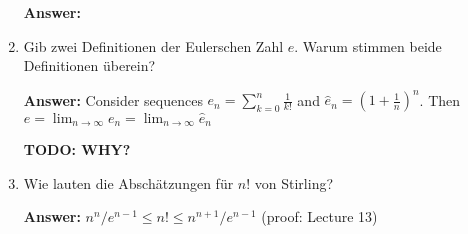 \documentclass[11pt]{article}
\newcommand{\sumn}[4]{\sum_{#1=#2}^{#3}{#4}}
\newcommand{\slim}[2]{\lim_{#1\to\infty}{#2}}
\begin{document}
\begin{enumerate}
    \textbf{Answer:}
    \item Gib zwei Definitionen der Eulerschen Zahl $e$. Warum stimmen beide Definitionen überein?
    
    \textbf{Answer:} Consider sequences $e_n = \sumn{k}{0}{n}{\frac{1}{k!}}$ and $\hat{e}_n = \left(1 + \frac{1}{n}\right)^n$. Then $e = \slim{n}{e_n} = \slim{n}{\hat{e}_n}$
    
    \textbf{TODO: WHY?}
    \item Wie lauten die Abschätzungen für $n!$ von Stirling?
    
    \textbf{Answer:} $n^n/e^{n-1} \le n! \le n^{n+1}/e^{n-1}$ (proof: Lecture 13)
\end{enumerate}
\end{document}
